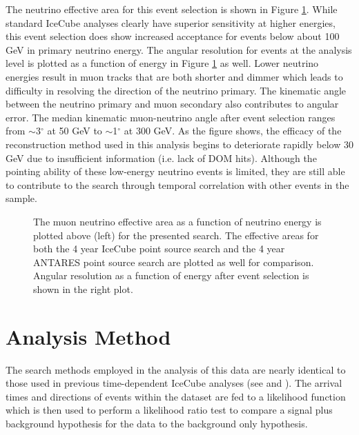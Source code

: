 \documentclass[manuscript]{aastex}
\begin{document}
The neutrino effective area for this event selection is shown in Figure \ref{fig:EffAreaAndAngularResolution}. While standard IceCube analyses clearly have superior sensitivity at higher energies, this event selection does show increased acceptance for events below about 100 GeV in primary neutrino energy. The angular resolution for events at the analysis level is plotted as a function of energy in Figure \ref{fig:EffAreaAndAngularResolution} as well. Lower neutrino energies result in muon tracks that are both shorter and dimmer which leads to difficulty in resolving the direction of the neutrino primary. The kinematic angle between the neutrino primary and muon secondary also contributes to angular error. The median kinematic muon-neutrino angle after event selection ranges from $\sim$3$^{\circ}$ at 50 GeV to $\sim$1$^{\circ}$ at 300 GeV. As the figure shows, the efficacy of the reconstruction method used in this analysis begins to deteriorate rapidly below 30 GeV due to insufficient information (i.e. lack of DOM hits). Although the pointing ability of these low-energy neutrino events is limited, they are still able to contribute to the search through temporal correlation with other events in the sample.
\begin{figure}[ht]
\caption[Analysis Effective Area and Angular Resolution]{The muon neutrino effective area as a function of neutrino energy is plotted above (left) for the presented search. The effective areas for both the 4 year IceCube point source search \citep{2014ApJ...796..109A} and the 4 year ANTARES point source search \citep{2012ApJ...760...53A} are plotted as well for comparison. Angular resolution as a function of energy after event selection is shown in the right plot.}
\label{fig:EffAreaAndAngularResolution}
\end{figure}


\section{Analysis Method}
The search methods employed in the analysis of this data are nearly identical to those used in previous time-dependent IceCube analyses (see \cite{2008APh....29..299B} and \cite{0004-637X-807-1-46}). The arrival times and directions of events within the dataset are fed to a likelihood function which is then used to perform a likelihood ratio test to compare a signal plus background hypothesis for the data to the background only hypothesis.
\end{document}
